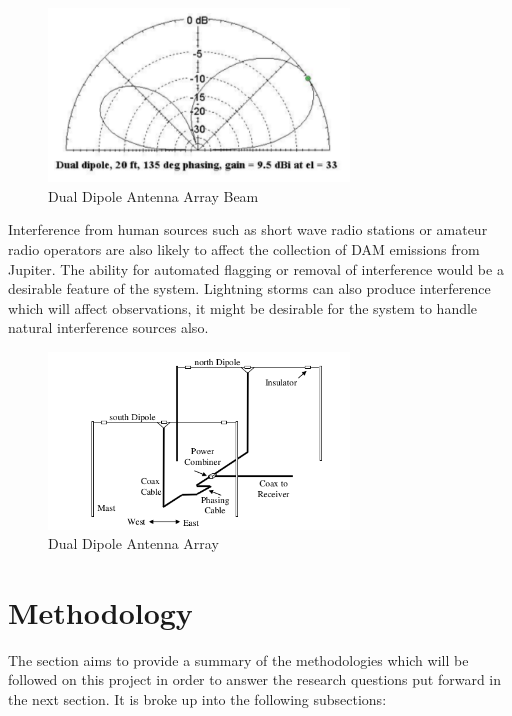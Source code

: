 \documentclass[runningheads,a4paper]{llncs}
\begin{document}
%
\begin{figure}[here]
\centering
\includegraphics[width=8cm]{images/09}
\caption{Dual Dipole Antenna Array Beam\citep{nasa12}}
\label{fig:dual_dipole_antenna_array_beam}
\end{figure}
%

Interference from human sources such as short wave radio stations or amateur radio operators are also likely to affect the collection of \gls{DAM} emissions from Jupiter. The ability for automated flagging or removal of interference would be a desirable feature of the system. Lightning storms can also produce interference which will affect observations, it might be desirable for the system to handle natural interference sources also.

%
\begin{figure}[here]
\centering
\includegraphics[width=8cm]{images/08}
\caption{Dual Dipole Antenna Array \citep{nasa12}}
\label{fig:dual_dipole_antenna_array}
\end{figure}
%

\newpage
\section*{Methodology}
The section aims to provide a summary of the methodologies which will be followed on this project in order to answer the research questions put forward in the next section. It is broke up into the following subsections:
\end{document}
